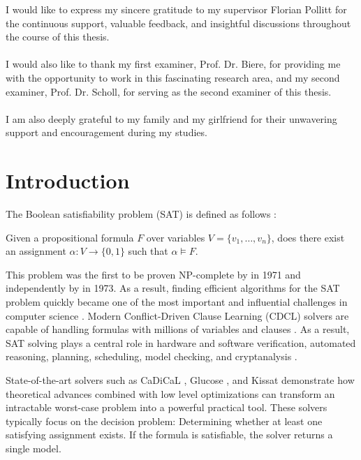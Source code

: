 \documentclass[12pt,a4paper]{article}
\begin{document}
I would like to express my sincere gratitude to my supervisor Florian Pollitt for the continuous support, valuable feedback, and insightful discussions throughout the course of this thesis.
\\
\\
I would also like to thank my first examiner, Prof. Dr. Biere, for providing me with the opportunity to work in this fascinating research area, and my second examiner, Prof. Dr. Scholl, for serving as the second examiner of this thesis.
\\
\\
I am also deeply grateful to my family and my girlfriend for their unwavering support and encouragement during my studies.


\newpage
\tableofcontents
\clearpage


\section{Introduction}
\label{sec:introduction}
The Boolean satisfiability problem (SAT) is defined as follows \cite{biere2021satisfiability}:

Given a propositional formula \( F \) over variables 
\( V = \{v_1, \dots, v_n\} \), does there exist an assignment 
\( \alpha : V \to \{0,1\} \) such that \( \alpha \models F \).

This problem was the first to be proven NP-complete by \citet{Cook1971} in 1971 and independently by \citet{Levin1973} in 1973. As a result, finding efficient algorithms for the SAT problem quickly became one of the most important and influential challenges in computer science \cite{BALYO201645}. Modern Conflict-Driven Clause Learning (CDCL) solvers are capable of handling formulas with millions of variables and clauses \cite{satcompetition2025}. As a result, SAT solving plays a central role in hardware and software verification, automated reasoning, planning, scheduling, model checking, and cryptanalysis \cite{biere2021satisfiability} \cite{10.1007/s42979-020-00181-4} \cite{7225110}.

State-of-the-art solvers such as CaDiCaL \cite{10.1007/978-3-031-65627-9_7}, Glucose \cite{audemard:hal-03299473}, and Kissat \cite{BiereFallerFazekasFleuryFroleyksPollitt-SAT-Competition-2024-solvers} demonstrate how theoretical advances combined with low level optimizations can transform an intractable worst-case problem into a powerful practical tool. These solvers typically focus on the decision problem: Determining whether at least one satisfying assignment exists. If the formula is satisfiable, the solver returns a single model.
\end{document}
